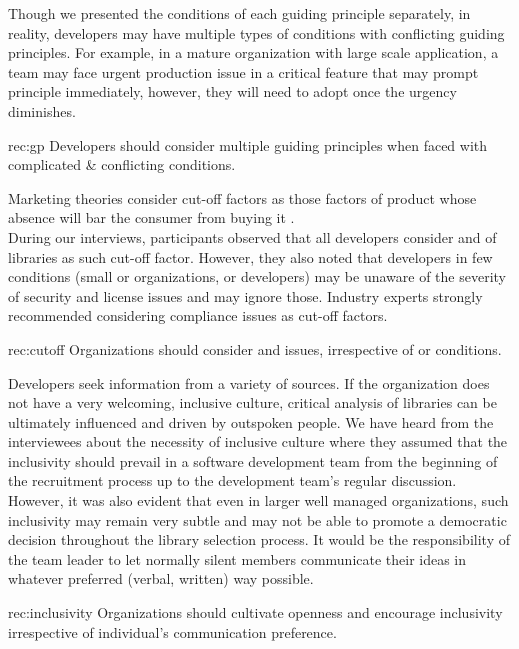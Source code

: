 Though we presented the conditions of each guiding principle separately, in reality, developers may have multiple types of conditions with conflicting guiding principles. For example, in a mature organization with large scale application, a team may face urgent production issue in a critical feature that may prompt  principle immediately, however, they will need to adopt  once the urgency diminishes. %
\begin{recommendation}{rec:gp}
Developers should consider multiple guiding principles when faced with complicated \& conflicting conditions. 
\end{recommendation}\medskip

Marketing theories consider cut-off factors as those factors of product whose absence will bar the consumer from buying it \cite{blackwell2001consumer}. \\%
During our interviews, participants observed that all developers consider  and  of libraries as such cut-off factor. However, they also noted that developers in few conditions (small or  organizations, or  developers) may be unaware of the severity of security and license issues and may ignore those. Industry experts strongly recommended  considering compliance issues as cut-off factors.
 \begin{recommendation}{rec:cutoff}
Organizations should consider  and  issues, irrespective of  or  conditions.
\end{recommendation}\medskip


Developers seek information from a variety of sources. If the organization does not have a very welcoming, inclusive culture, critical analysis of libraries can be ultimately influenced and driven by outspoken people. We have heard from the interviewees about the necessity of inclusive culture where they assumed that the inclusivity should prevail in a software development team from the beginning of the recruitment process up to the development team's regular discussion. However, it was also evident that even in larger well managed organizations, such inclusivity may remain very subtle and may not be able to promote a democratic decision throughout the library selection process. It would be the responsibility of the team leader to let normally silent members communicate their ideas in whatever preferred (verbal, written) way possible.
 \begin{recommendation}{rec:inclusivity}
Organizations should cultivate openness and encourage inclusivity irrespective of individual's communication preference. 
\end{recommendation}\medskip

